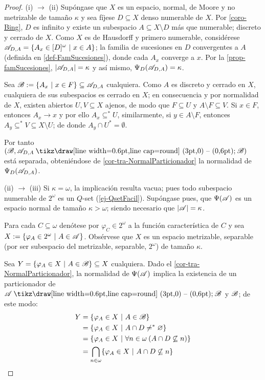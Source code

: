     \begin{proof}
        (i) $\to$ (ii) Supóngase que $X$ es un espacio, normal, de Moore y no metrizable de tamaño $\kappa$ y sea fíjese $D\subseteq X$ denso numerable de $X$. Por \ref{coro-Bing}, $D$ es infinito y existe un subespacio $A \subseteq X \setminus D$ más que numerable; discreto y cerrado de $X$. Como $X$ es de Hausdorff y primero numerable, considérese $ \mathscr{A}_{D,A}=\{A_x \in [D]^\omega \text{ $|$ } x \in A\} $; la familia de sucesiones en $D$ convergentes a $A$ (definida en \ref{def-FamSucesiones}), donde cada $A_x$ converge a $x$. Por la \autoref{prop-famSucesiones}, $|\mathscr{A}_{D,A}|=\kappa$ y así mismo, $\Psi_D(\mathscr{A}_{D,A})=\kappa$.

        Sea $\mathscr{B}:=\{A_x \text{ $|$ } x \in F\} \subseteq \mathscr{A}_{D,A}$ cualquiera. Como $A$ es discreto y cerrado en $X$, cualquiera de sus subespacios es cerrado en $X$; en consecuencia y por normalidad de $X$, existen abiertos $U,V \subseteq X$ ajenos, de modo que $F \subseteq U$ y $A \setminus F \subseteq V$. Si $x \in F$, entonces $A_x \to x$ y por ello $A_x \subseteq^* U$, similarmente, si $y \in A \setminus F$, entonces $A_y \subseteq^* V \subseteq X \setminus U$; de donde $A_y \cap U^* = \emptyset$.

        Por tanto $(\ms{B}, \ms{A}_{D,A} \setminus \ms{B})$ está separada, obteniéndose de \ref{cor-tra-NormalParticionador} la normalidad de $\Psi_D(\mathscr{A}_{D,A})$.

        (ii) $\to$ (iii) Si $\kappa = \omega$, la implicación resulta vacua; pues todo subespacio numerable de $2^\omega$ es un $Q$-set (\autoref{ej-QsetFacil}). Supóngase pues, que $\Psi(\mathscr{A})$ es un espacio normal de tamaño $\kappa>\omega$; siendo necesario que $|\mathscr{A}|=\kappa$.

        Para cada $C \subseteq \omega$ denótese por $\varphi_C \in 2^ \omega$ a la función característica de $C$ y sea $X:=\{\varphi_A \in 2^\omega \text{ $|$ } A \in \mathscr{A} \}$. Obsérvese que $X$ es un espacio metrizable, separable (por ser subespacio del metrizable, separable, $2^\omega$) de tamaño $\kappa$.

        Sea $Y = \{ \varphi_A \in X \text{ $|$ } A \in \mathscr{B} \} \subseteq X$ cualquiera. Dado el \autoref{cor-tra-NormalParticionador}, la normalidad de $\Psi(\mathscr{A})$ implica la existencia de un particionador de $\ms{A}\setminus \ms{B}$ y $\mathscr{B}$; de este modo:
        \begin{align*}
            Y   & = \{ \varphi_A \in X \text{ $|$ } A \in \mathscr{B} \} \\
                & = \{ \varphi_A \in X \text{ $|$ } A \cap D \neq^* \varnothing \} \\
                & = \{ \varphi_A \in X \text{ $|$ } \forall n \in \omega \: ( A \cap D \not\subseteq n) \} \\
                & = \bigcap_{n \in \omega} \{\varphi_A \in X \text{ $|$ } A \cap D \not\subseteq n\}
        \end{align*}


\end{proof}
